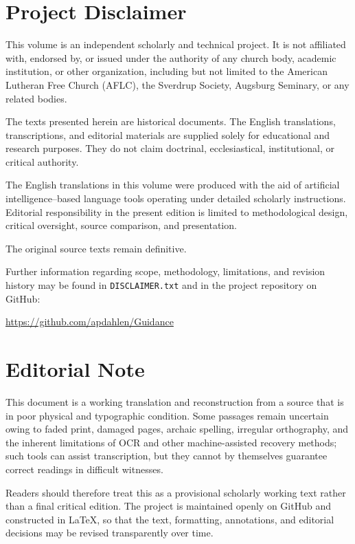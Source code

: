\section*{Project Disclaimer}

This volume is an independent scholarly and technical project. It is not affiliated with, endorsed by, or issued under the authority of any church body, academic institution, or other organization, including but not limited to the American Lutheran Free Church (AFLC), the Sverdrup Society, Augsburg Seminary, or any related bodies.


The texts presented herein are historical documents. The English translations, transcriptions, and editorial materials are supplied solely for educational and research purposes. They do not claim doctrinal, ecclesiastical, institutional, or critical authority.

The English translations in this volume were produced with the aid of artificial intelligence–based language tools operating under detailed scholarly instructions. Editorial responsibility in the present edition is limited to methodological design, critical oversight, source comparison, and presentation.

The original source texts remain definitive.

Further information regarding scope, methodology, limitations, and revision history may be found in \texttt{DISCLAIMER.txt} and in the project repository on GitHub:

\url{https://github.com/apdahlen/Guidance}


\section*{Editorial Note}

This document is a working translation and reconstruction from a source that is in poor physical and typographic condition. Some passages remain uncertain owing to faded print, damaged pages, archaic spelling, irregular orthography, and the inherent limitations of OCR and other machine-assisted recovery methods; such tools can assist transcription, but they cannot by themselves guarantee correct readings in difficult witnesses.

Readers should therefore treat this as a provisional scholarly working text rather than a final critical edition. The project is maintained openly on GitHub and constructed in \LaTeX, so that the text, formatting, annotations, and editorial decisions may be revised transparently over time.

